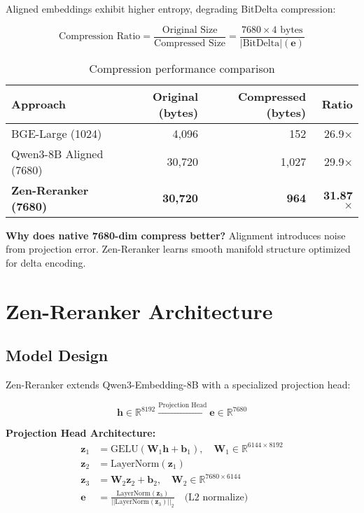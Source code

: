 \documentclass[11pt,a4paper]{article}
\begin{document}
Aligned embeddings exhibit higher entropy, degrading BitDelta compression:

\begin{equation}
\text{Compression Ratio} = \frac{\text{Original Size}}{\text{Compressed Size}} = \frac{7680 \times 4\text{ bytes}}{\text{|BitDelta|}(\mathbf{e})}
\end{equation}

\begin{table}[h]
\centering
\caption{Compression performance comparison}
\begin{tabular}{lrrr}
\toprule
\textbf{Approach} & \textbf{Original (bytes)} & \textbf{Compressed (bytes)} & \textbf{Ratio} \\
\midrule
BGE-Large (1024) & 4,096 & 152 & 26.9$\times$ \\
Qwen3-8B Aligned (7680) & 30,720 & 1,027 & 29.9$\times$ \\
\textbf{Zen-Reranker (7680)} & \textbf{30,720} & \textbf{964} & \textbf{31.87$\times$} \\
\bottomrule
\end{tabular}
\end{table}

\textbf{Why does native 7680-dim compress better?} Alignment introduces noise from projection error. Zen-Reranker learns smooth manifold structure optimized for delta encoding.

\section{Zen-Reranker Architecture}

\subsection{Model Design}

Zen-Reranker extends Qwen3-Embedding-8B with a specialized projection head:

\begin{equation}
\mathbf{h} \in \mathbb{R}^{8192} \xrightarrow{\text{Projection Head}} \mathbf{e} \in \mathbb{R}^{7680}
\end{equation}

\textbf{Projection Head Architecture:}
\begin{align}
\mathbf{z}_1 &= \text{GELU}(\mathbf{W}_1 \mathbf{h} + \mathbf{b}_1), \quad \mathbf{W}_1 \in \mathbb{R}^{6144 \times 8192} \\
\mathbf{z}_2 &= \text{LayerNorm}(\mathbf{z}_1) \\
\mathbf{z}_3 &= \mathbf{W}_2 \mathbf{z}_2 + \mathbf{b}_2, \quad \mathbf{W}_2 \in \mathbb{R}^{7680 \times 6144} \\
\mathbf{e} &= \frac{\text{LayerNorm}(\mathbf{z}_3)}{||\text{LayerNorm}(\mathbf{z}_3)||_2} \quad \text{(L2 normalize)}
\end{align}
\end{document}
